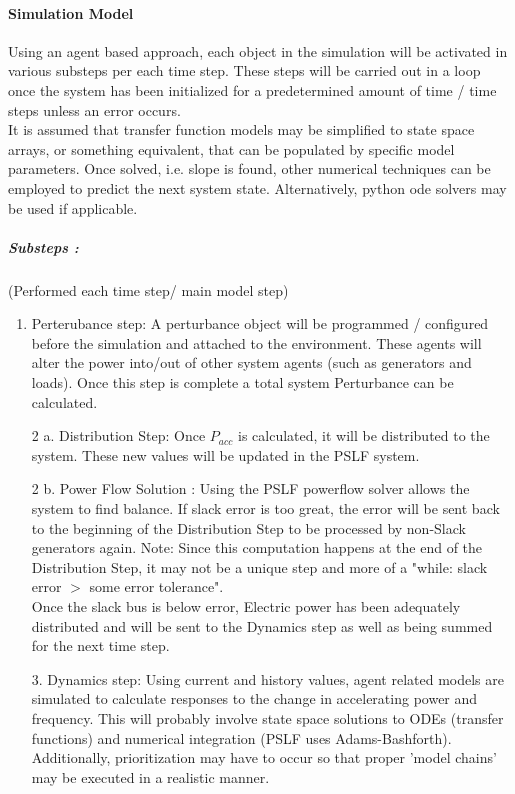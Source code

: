 \documentclass[12pt]{article}
\begin{document}
\pagebreak
\paragraph{Simulation Model}
Using an agent based approach, each object in the simulation will be activated in various substeps per each time step. These steps will be carried out in a loop once the system has been initialized for a predetermined amount of time / time steps unless an error occurs.\\
It is assumed that transfer function models may be simplified to state space arrays, or something equivalent, that can be populated by specific model parameters. Once solved, i.e. slope is found, other numerical techniques can be employed to predict the next system state. Alternatively, python ode solvers may be used if applicable.
\subparagraph{Substeps :}(Performed each time step/ main model step)
\begin{enumerate}
	\item Perterubance step: A perturbance object will be programmed / configured before the simulation and attached to the environment. These agents will alter the power into/out of other system agents (such as generators and loads). Once this step is complete a total system Perturbance can be calculated.
	\item[2 a.] Distribution Step: Once $P_{acc}$ is calculated, it will be distributed to the system. These new values will be updated in the PSLF system.
	\item[2 b.] Power Flow Solution : Using the PSLF powerflow solver allows the system to find balance. If slack error is too great, the error will be sent back to the beginning of the Distribution Step to be processed  by non-Slack generators again. Note: Since this computation happens at the end of the Distribution Step, it may not be a unique step and more of a "while: slack error $>$ some error tolerance".\\
	Once the slack bus is below error, Electric power has been adequately distributed and will be sent to the Dynamics step as well as being summed for the next time step.
	\item[3.] Dynamics step: Using current and history values, agent related models are simulated to calculate responses to the change in accelerating power and frequency. This will probably involve state space solutions to ODEs (transfer functions) and numerical integration (PSLF uses Adams-Bashforth). Additionally, prioritization may have to occur so that proper 'model chains' may be executed in a realistic manner.
\end{enumerate}
\end{document}

